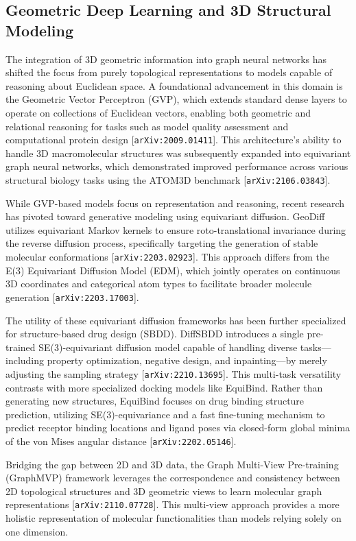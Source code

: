 \documentclass[11pt]{article}
\begin{document}
\subsection{Geometric Deep Learning and 3D Structural Modeling}

The integration of 3D geometric information into graph neural networks has shifted the focus from purely topological representations to models capable of reasoning about Euclidean space. A foundational advancement in this domain is the Geometric Vector Perceptron (GVP), which extends standard dense layers to operate on collections of Euclidean vectors, enabling both geometric and relational reasoning for tasks such as model quality assessment and computational protein design [\texttt{arXiv:2009.01411}]. This architecture's ability to handle 3D macromolecular structures was subsequently expanded into equivariant graph neural networks, which demonstrated improved performance across various structural biology tasks using the ATOM3D benchmark [\texttt{arXiv:2106.03843}].

While GVP-based models focus on representation and reasoning, recent research has pivoted toward generative modeling using equivariant diffusion. GeoDiff utilizes equivariant Markov kernels to ensure roto-translational invariance during the reverse diffusion process, specifically targeting the generation of stable molecular conformations [\texttt{arXiv:2203.02923}]. This approach differs from the E(3) Equivariant Diffusion Model (EDM), which jointly operates on continuous 3D coordinates and categorical atom types to facilitate broader molecule generation [\texttt{arXiv:2203.17003}].

The utility of these equivariant diffusion frameworks has been further specialized for structure-based drug design (SBDD). DiffSBDD introduces a single pre-trained SE(3)-equivariant diffusion model capable of handling diverse tasks—including property optimization, negative design, and inpainting—by merely adjusting the sampling strategy [\texttt{arXiv:2210.13695}]. This multi-task versatility contrasts with more specialized docking models like EquiBind. Rather than generating new structures, EquiBind focuses on drug binding structure prediction, utilizing SE(3)-equivariance and a fast fine-tuning mechanism to predict receptor binding locations and ligand poses via closed-form global minima of the von Mises angular distance [\texttt{arXiv:2202.05146}].

Bridging the gap between 2D and 3D data, the Graph Multi-View Pre-training (GraphMVP) framework leverages the correspondence and consistency between 2D topological structures and 3D geometric views to learn molecular graph representations [\texttt{arXiv:2110.07728}]. This multi-view approach provides a more holistic representation of molecular functionalities than models relying solely on one dimension.
\end{document}
